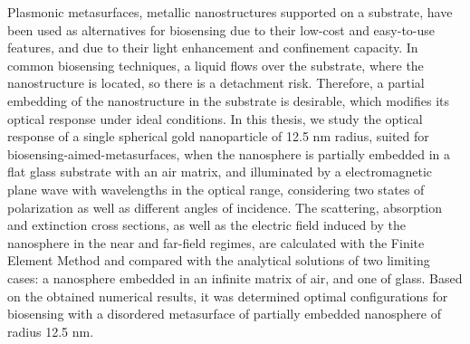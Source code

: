

\begin{abstracts}        %

\small
Plasmonic metasurfaces, metallic nanostructures supported on a substrate, have been used as alternatives for biosensing due to their low-cost and easy-to-use features, and due to their light enhancement and confinement capacity. In common biosensing techniques, a liquid flows over the substrate, where the nanostructure is located, so there is a  detachment risk. Therefore, a partial embedding of the nanostructure in the substrate is desirable, which modifies its optical response under ideal conditions. In this thesis, we study the optical response of a single spherical gold nanoparticle of 12.5 nm radius, suited for biosensing-aimed-metasurfaces, when the nanosphere is partially embedded in a flat glass substrate with an air matrix, and illuminated by a  electromagnetic plane wave with wavelengths in the optical range, considering two states of polarization as well as different angles of incidence. The scattering, absorption and extinction cross sections, as well as the electric field induced by the nanosphere in the near and far-field regimes, are calculated with the Finite Element Method and compared with the analytical solutions of two limiting cases: a nanosphere embedded in an infinite matrix of air, and one of glass. Based on the obtained numerical results, it was determined optimal configurations for  biosensing with a disordered metasurface of partially embedded nanosphere of radius 12.5 nm.\\[2em]


\end{abstracts}
